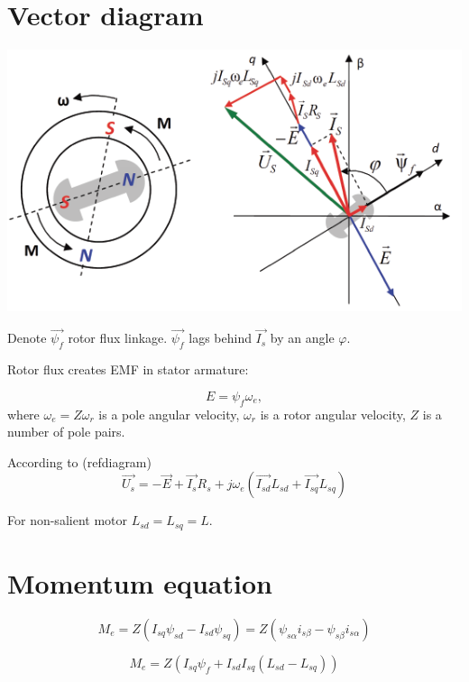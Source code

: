 \documentclass[11pt,a4paper,oneside]{report}
\begin{document}
	
\section{Vector diagram}

\begin{center}
	\includegraphics[scale=1]{motor}
\end{center}

Denote $\vec{\psi_f}$ rotor flux linkage. $\vec{\psi_f}$ lags behind $\vec{I_s}$ by an angle $\varphi$.

Rotor flux creates EMF in stator armature:

\begin{equation}
	E=\psi_f\omega_e,
\end{equation}
where $\omega_e=Z\omega_r$ is a pole angular velocity, $\omega_r$ is a rotor angular velocity, $Z$ is a number of pole pairs.

According to (ref{diagram})
\begin{equation}
	\vec{U_s} = -\vec{E}+\vec{I_s}R_s+j\omega_e(\vec{I_{sd}}L_{sd}+\vec{I_{sq}}L_{sq})
\end{equation}

For non-salient motor $L_{sd}=L_{sq}=L$.

\section{Momentum equation}

\begin{equation}
	M_e=Z(I_{sq}\psi_{sd}-I_{sd}\psi_{sq}) = Z(\psi_{s\alpha}i_{s\beta}-\psi_{s\beta}i_{s\alpha})
\end{equation}

\begin{equation}
	M_e=Z(I_{sq}\psi_f+I_{sd}I_{sq}(L_{sd}-L_{sq}))
\end{equation}
\end{document}

